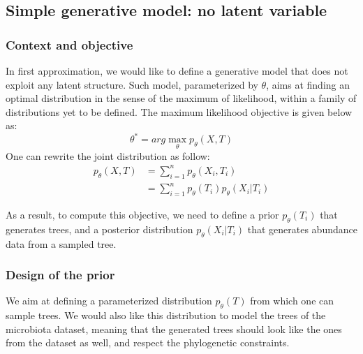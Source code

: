 \subsection{Simple generative model: no latent variable}

\subsubsection{Context and objective}

In first approximation, we would like to define a generative model that does not exploit any latent structure.
Such model, parameterized by $\theta$, aims at finding an optimal distribution in the sense of the maximum of likelihood,
within a family of distributions yet to be defined.
The maximum likelihood objective is given below as:
$$
\theta^* = arg\max_{\theta} p_{\theta}(X, T)
$$
One can rewrite the joint distribution as follow:
$$
\begin{align}
    p_{\theta}(X, T) &= \sum_{i=1}^n p_{\theta}(X_i, T_i) \\
                    &= \sum_{i=1}^n p_{\theta}(T_i) p_{\theta}(X_i | T_i)
\end{align}
$$

As a result, to compute this objective, we need to define a prior $p_{\theta}(T_i)$ that generates trees,
and a posterior distribution $p_{\theta}(X_i | T_i)$ that generates abundance data from a sampled tree.

\subsubsection{Design of the prior}

We aim at defining a parameterized distribution $p_{\theta}(T)$ from which one can sample trees.
We would also like this distribution to model the trees of the microbiota dataset, meaning that
the generated trees should look like the ones from the dataset as well, and respect the phylogenetic constraints. \\

